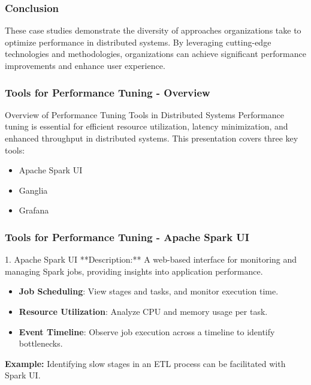 \documentclass{beamer}
\begin{document}
\begin{frame}[fragile]
    \frametitle{Conclusion}
    These case studies demonstrate the diversity of approaches organizations take to optimize performance in distributed systems. By leveraging cutting-edge technologies and methodologies, organizations can achieve significant performance improvements and enhance user experience.
\end{frame}

\begin{frame}[fragile]
    \frametitle{Tools for Performance Tuning - Overview}
    \begin{block}{Overview of Performance Tuning Tools in Distributed Systems}
        Performance tuning is essential for efficient resource utilization, latency minimization, and enhanced throughput in distributed systems. This presentation covers three key tools:
        \begin{itemize}
            \item Apache Spark UI
            \item Ganglia
            \item Grafana
        \end{itemize}
    \end{block}
\end{frame}

\begin{frame}[fragile]
    \frametitle{Tools for Performance Tuning - Apache Spark UI}
    \begin{block}{1. Apache Spark UI}
        **Description:** A web-based interface for monitoring and managing Spark jobs, providing insights into application performance.

        \begin{itemize}
            \item \textbf{Job Scheduling}: View stages and tasks, and monitor execution time.
            \item \textbf{Resource Utilization}: Analyze CPU and memory usage per task.
            \item \textbf{Event Timeline}: Observe job execution across a timeline to identify bottlenecks.
        \end{itemize}
        
        \textbf{Example:} Identifying slow stages in an ETL process can be facilitated with Spark UI.
    \end{block}
\end{frame}
\end{document}
